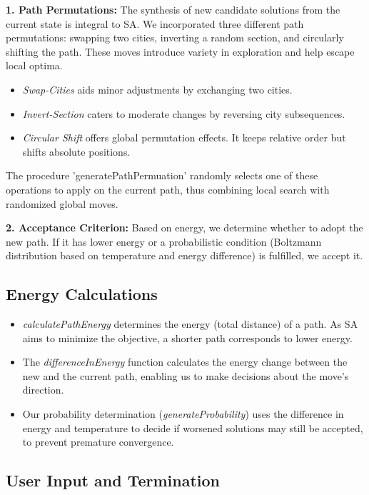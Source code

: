\documentclass[a4paper,10pt]{article}
\begin{document}
\textbf{1. Path Permutations:} The synthesis of new candidate solutions from the current state is integral to SA. We incorporated three different path permutations: swapping two cities, inverting a random section, and circularly shifting the path. These moves introduce variety in exploration and help escape local optima.

\begin{itemize}
  \item \emph{Swap-Cities} aids minor adjustments by exchanging two cities.
  \item \emph{Invert-Section} caters to moderate changes by reversing city subsequences.
  \item \emph{Circular Shift} offers global permutation effects. It keeps relative order but shifts absolute positions.
\end{itemize}

The procedure 'generatePathPermuation' randomly selects one of these operations to apply on the current path, thus combining local search with randomized global moves.

\textbf{2. Acceptance Criterion:} Based on energy, we determine whether to adopt the new path. If it has lower energy or a probabilistic condition (Boltzmann distribution based on temperature and energy difference) is fulfilled, we accept it.

\subsection{Energy Calculations}

\begin{itemize}
  \item \emph{calculatePathEnergy} determines the energy (total distance) of a path. As SA aims to minimize the objective, a shorter path corresponds to lower energy.
  \item The \emph{differenceInEnergy} function calculates the energy change between the new and the current path, enabling us to make decisions about the move's direction.
  \item Our probability determination (\emph{generateProbability}) uses the difference in energy and temperature to decide if worsened solutions may still be accepted, to prevent premature convergence.
\end{itemize}

\subsection{User Input and Termination}
\end{document}

